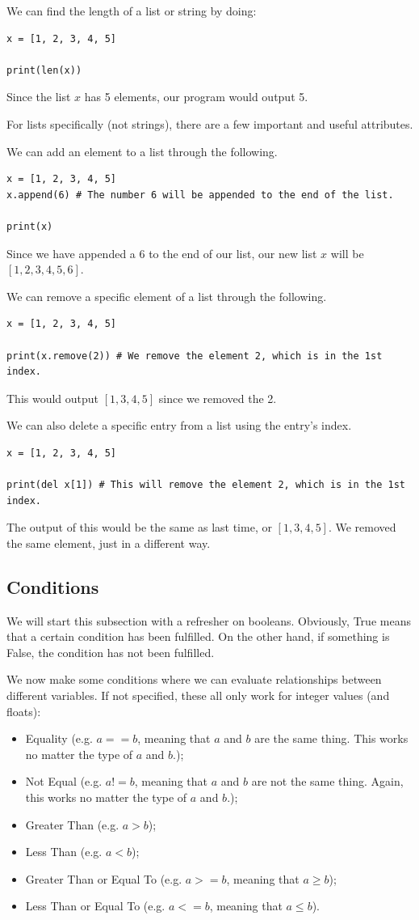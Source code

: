 \documentclass{article}
\begin{document}
We can find the length of a list or string by doing:
\begin{lstlisting}
x = [1, 2, 3, 4, 5]

print(len(x))
\end{lstlisting}
Since the list $x$ has 5 elements, our program would output 5.

For lists specifically (not strings), there are a few important and useful attributes. 

We can add an element to a list through the following.
\begin{lstlisting}
x = [1, 2, 3, 4, 5]
x.append(6) # The number 6 will be appended to the end of the list.

print(x)
\end{lstlisting}
Since we have appended a 6 to the end of our list, our new list $x$ will be $[1,2,3,4,5,6]$.

We can remove a specific element of a list through the following.
\begin{lstlisting}
x = [1, 2, 3, 4, 5]

print(x.remove(2)) # We remove the element 2, which is in the 1st index.
\end{lstlisting}
This would output $[1,3,4,5]$ since we removed the 2. 

We can also delete a specific entry from a list using the entry's index.
\begin{lstlisting}
x = [1, 2, 3, 4, 5]

print(del x[1]) # This will remove the element 2, which is in the 1st index.
\end{lstlisting}
The output of this would be the same as last time, or $[1,3,4,5]$. We removed the same element, just in a different way. 

\subsection{Conditions}
We will start this subsection with a refresher on booleans. Obviously, True means that a certain condition has been fulfilled. On the other hand, if something is False, the condition has not been fulfilled. 

We now make some conditions where we can evaluate relationships between different variables. If not specified, these all only work for integer values (and floats):
\begin{itemize}
    \item Equality (e.g. $a==b$, meaning that $a$ and $b$ are the same thing. This works no matter the type of $a$ and $b$.);
    \item Not Equal (e.g. $a!=b$, meaning that $a$ and $b$ are not the same thing. Again, this works no matter the type of $a$ and $b$.);
    \item Greater Than (e.g. $a>b$);
    \item Less Than (e.g. $a<b$);
    \item Greater Than or Equal To (e.g. $a>=b$, meaning that $a\geq b$);
    \item Less Than or Equal To (e.g. $a<=b$, meaning that $a\leq b$).
\end{itemize}
\end{document}
